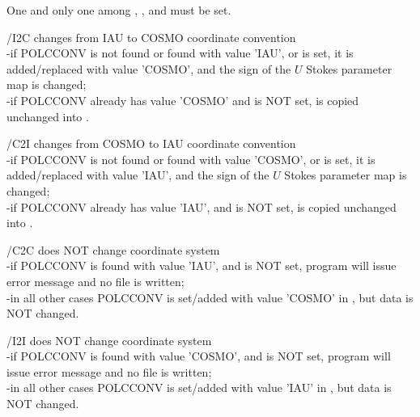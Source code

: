\begin{keywords}
One and only one among 
, 
, 
 and 
 must be set.\\
  \begin{kwlist}{} %
        \item[{/I2C}]   changes from IAU to COSMO coordinate convention \\
            -if POLCCONV is not found or found with value 'IAU', 
	     or  is set,
             it is added/replaced with value 'COSMO', and the sign of the $U$ Stokes parameter map is changed; \\
            -if POLCCONV already has value 'COSMO' 
             and  is NOT set, 
              is copied
             unchanged into .

        \item[{/C2I}]   changes from COSMO to IAU coordinate convention \\
            -if POLCCONV is not found or found with value 'COSMO', 
	     or  is set,
             it is added/replaced with value 'IAU', and the sign of the $U$ Stokes parameter map is changed; \\
            -if POLCCONV already has value 'IAU',  
             and  is NOT set, 
              is copied
             unchanged into .

        \item[{/C2C}]   does NOT change coordinate system \\
            -if POLCCONV is found with value 'IAU', 
             and  is NOT set,
             program will issue error message and no file is written; \\
            -in all other cases POLCCONV is set/added with value 'COSMO' in , 
             but data is NOT changed.

        \item[{/I2I}]   does NOT change coordinate system \\
            -if POLCCONV is found with value 'COSMO', 
             and  is NOT set,
             program will issue error message and no file is written; \\
            -in all other cases POLCCONV is set/added with value 'IAU' in , 
             but data is NOT changed.


\end{kwlist}
\end{keywords}
